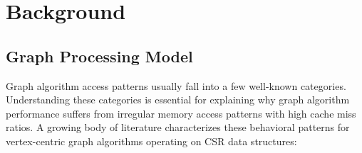 \documentclass[sigconf, nonacm]{acmart}
\begin{document}
\section{Background}
\label{sec:background}

\subsection{Graph Processing Model}
\label{sec:processing_model}
Graph algorithm access patterns usually fall into a few well-known categories. Understanding these categories is essential for explaining why graph algorithm performance suffers from irregular memory access patterns with high cache miss ratios. A growing body of literature \cite{beamer_direction-optimizing_2012, besta_push_2017} characterizes these behavioral patterns for vertex-centric graph algorithms operating on CSR data structures:
\end{document}
